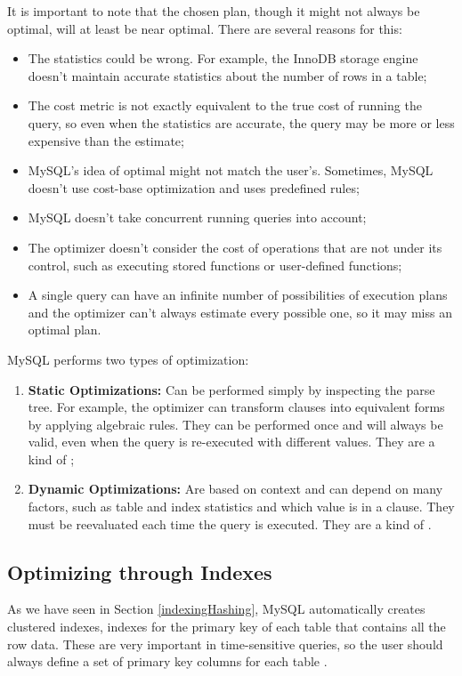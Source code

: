 \documentclass[12pt]{article}
\begin{document}
It is important to note that the chosen plan, though it might not always be optimal, will at least be near optimal. There are several reasons for this:
\begin{itemize}
    \item The statistics could be wrong. For example, the InnoDB storage engine doesn't maintain accurate statistics about the number of rows in a table;
    \item The cost metric is not exactly equivalent to the true cost of running the query, so even when the statistics are accurate, the query may be more or less expensive than the estimate;
    \item MySQL’s idea of optimal might not match the user's. Sometimes, MySQL doesn't use cost-base optimization and uses predefined rules;
    \item MySQL doesn't take concurrent running queries into account;
    \item The optimizer doesn't consider the cost of operations that are not under its control, such as executing stored functions or user-defined functions;
    \item A single query can have an infinite number of possibilities of execution plans and the optimizer can’t always estimate every possible one, so it may miss an optimal plan.
\end{itemize}

MySQL performs two types of optimization:
\begin{enumerate}
    \item \textbf{Static Optimizations:} Can be performed simply by inspecting the parse tree. For example, the optimizer can transform clauses into equivalent forms by applying algebraic rules. They can be performed once and will always be valid, even when the query is re-executed with different values. They are a kind of ;
    
    \item \textbf{Dynamic Optimizations:} Are based on context and can depend on many factors, such as table and index statistics and which value is in a clause. They must be reevaluated each time the query is executed. They are a kind of . 

\end{enumerate}


\subsection{Optimizing through Indexes}
\label{optimizingIndexes}
As we have seen in Section \ref{indexingHashing}, MySQL automatically creates clustered indexes, indexes for the primary key of each table that contains all the row data. These are very important in time-sensitive queries, so the user should always define a set of primary key columns for each table \parencite{OptimizingInnoDBQueries}.
\end{document}
